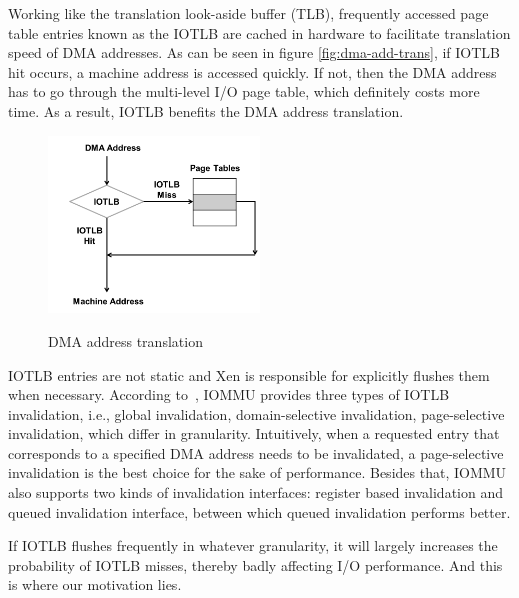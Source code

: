 Working like the translation look-aside buffer (TLB), frequently accessed page table entries known as the IOTLB are cached in hardware to facilitate translation speed of DMA addresses. As can be seen in figure \ref{fig:dma-add-trans}, if IOTLB hit occurs, a machine address is accessed quickly. If not, then the DMA address has to go through the multi-level I/O page table, which definitely costs more time. As a result, IOTLB benefits the DMA address translation.

\begin{figure}[ht]
\centering
\includegraphics[width=0.5\textwidth]{image/background/dma-address-translation.png} \\
\caption{DMA address translation}
\label{fig: dma-add-trans}
\end{figure}

IOTLB entries are not static and Xen is responsible for explicitly flushes them when necessary. According to~\cite{intelvt}, IOMMU provides three types of IOTLB invalidation, i.e., global invalidation, domain-selective invalidation, page-selective invalidation, which differ in granularity. Intuitively, when a requested entry that corresponds to a specified DMA address needs to be invalidated, a page-selective invalidation is the best choice for the sake of performance. Besides that, IOMMU also supports two kinds of invalidation interfaces: register based invalidation and queued invalidation interface, between which queued invalidation performs better.

If IOTLB flushes frequently in whatever granularity, it will largely increases the probability of IOTLB misses, thereby badly affecting I/O performance. And this is where our motivation lies.
